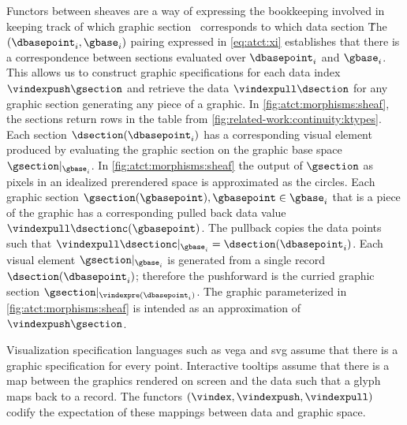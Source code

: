 \documentclass[10pt,journal,compsoc]{IEEEtran}
\theoremstyle{definition}
\theoremstyle{remark}
\begin{document}
Functors between sheaves are a way of expressing the bookkeeping involved in keeping track of which graphic section \gsection\ corresponds to which data section \dsection\. The $(\dbasepoint_i, \gbase_i)$ pairing expressed in \autoref{eq:atct:xi} establishes that there is a correspondence between sections evaluated over $\dbasepoint_i$ and $\gbase_i$. This allows us to construct graphic specifications for each data index $\vindexpush\gsection$ and retrieve the data $\vindexpull\dsection$ for any graphic section generating any piece of a graphic. In \autoref{fig:atct:morphisms:sheaf}, the sections return rows in the table from \autoref{fig:related-work:continuity:ktypes}. Each section $\dsection(\dbasepoint_{i})$ has a corresponding visual element produced by evaluating the graphic section on the graphic base space $\gsection|_{\gbase_{i}}$. In \autoref{fig:atct:morphisms:sheaf} the output of $\gsection$ as pixels in an idealized prerendered space is approximated as the circles. Each graphic section $\gsection(\gbasepoint), \gbasepoint \in \gbase_{i}$ that is a piece of the graphic has a corresponding pulled back data value $\vindexpull\dsectionc(\gbasepoint)$. The pullback copies the data points such that $\vindexpull\dsectionc|_{\gbase_i} = \dsection(\dbasepoint_i)$. Each visual element $\gsection|_{\gbase_i}$ is generated from a single record $\dsection(\dbasepoint_i)$; therefore the pushforward is the curried graphic section $\gsection|_{\vindexpre(\dbasepoint_i)}$. The graphic parameterized in \autoref{fig:atct:morphisms:sheaf} is intended as an approximation of $\vindexpush\gsection$.

Visualization specification languages such as vega \cite{heerDeclarative2010} and svg \cite{quintScalable2003} assume that there is a graphic  specification for every point. Interactive tooltips assume that there is a map between the graphics rendered on screen and the data such that a glyph maps back to a record. The functors $(\vindex, \vindexpush, \vindexpull)$ codify the expectation of these mappings between data and graphic space. 
\end{document}
